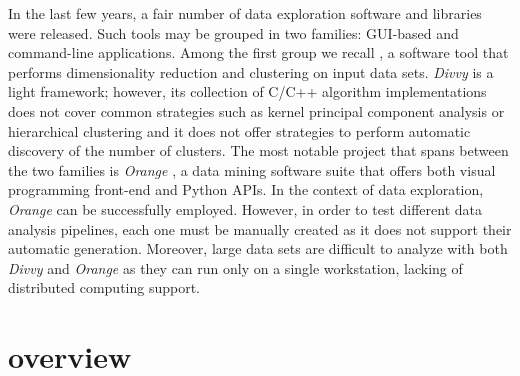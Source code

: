 In the last few years, a fair number of data exploration software and libraries were released. Such tools may be grouped in two families: \ac{GUI}-based and command-line applications.
Among the first group we recall  \cite{lewis2013divvy}, a software tool that performs dimensionality reduction and clustering on input data sets. \emph{Divvy} is a light framework; however,
its collection of {C/C++} algorithm implementations does not cover common strategies such as kernel principal component analysis \cite{scholkopf1997kernel} or hierarchical clustering \cite{hastie2009elements} and it does not offer strategies to perform automatic discovery of the number of clusters.
The most notable project that spans between the two families is \emph{Orange} \cite{demvsar2013orange}, a data mining software suite that offers both visual programming front-end and Python \ac{API}s. In the context of data exploration, \emph{Orange} can be successfully employed. However, in order to test different data analysis pipelines, each one must be manually created as it does not support their automatic generation.
Moreover, large data sets are difficult to analyze with both \emph{Divvy} and \emph{Orange} as they can run only on a single workstation, lacking of distributed computing support.

\section{\ade overview} \label{sec:adenine_overview}


